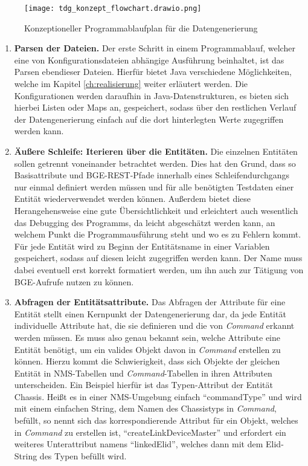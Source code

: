 \begin{figure}[htp]
    \centering
    \texttt{[image: tdg\_konzept\_flowchart.drawio.png]}
    \caption{Konzeptioneller Programmablaufplan für die Datengenerierung\footnotemark}
\end{figure}

\newpage
\begin{enumerate}
    \item \textbf{Parsen der Dateien.} Der erste Schritt in einem Programmablauf, welcher eine von Konfigurationsdateien abhängige Ausführung beinhaltet, ist das Parsen ebendieser Dateien. Hierfür bietet Java verschiedene Möglichkeiten, welche im Kapitel \ref{ch:realisierung} weiter erläutert werden. Die Konfigurationen werden daraufhin in Java-Datenstrukturen, es bieten sich hierbei Listen oder Maps an, gespeichert, sodass über den restlichen Verlauf der Datengenerierung einfach auf die dort hinterlegten Werte zugegriffen werden kann.
    \item \textbf{Äußere Schleife: Iterieren über die Entitäten.} Die einzelnen Entitäten sollen getrennt voneinander betrachtet werden. Dies hat den Grund, dass so Basisattribute und \ac{BGE}-\ac{REST}-Pfade innerhalb eines Schleifendurchgangs nur einmal definiert werden müssen und für alle benötigten Testdaten einer Entität wiederverwendet werden können. Außerdem bietet diese Herangehensweise eine gute Übersichtlichkeit und erleichtert auch wesentlich das Debugging des Programms, da leicht abgeschätzt werden kann, an welchem Punkt die Programmausführung steht und wo es zu Fehlern kommt. Für jede Entität wird zu Beginn der Entitätsname in einer Variablen gespeichert, sodass auf diesen leicht zugegriffen werden kann. Der Name muss dabei eventuell erst korrekt formatiert werden, um ihn auch zur Tätigung von \ac{BGE}-Aufrufe nutzen zu können.
    \item \textbf{Abfragen der Entitätsattribute.} Das Abfragen der Attribute für eine Entität stellt einen Kernpunkt der Datengenerierung dar, da jede Entität individuelle Attribute hat, die sie definieren und die von \textit{Command} erkannt werden müssen. Es muss also genau bekannt sein, welche Attribute eine Entität benötigt, um ein valides Objekt davon in \textit{Command} erstellen zu können. Hierzu kommt die Schwierigkeit, dass sich Objekte der gleichen Entität in \ac{NMS}-Tabellen und \textit{Command}-Tabellen in ihren Attributen unterscheiden. Ein Beispiel hierfür ist das Typen-Attribut der Entität Chassis. Heißt es in einer \ac{NMS}-Umgebung einfach \enquote{commandType} und wird mit einem einfachen String, dem Namen des Chassistyps in \textit{Command}, befüllt, so nennt sich das korrespondierende Attribut für ein Objekt, welches in \textit{Command} zu erstellen ist, \enquote{createLinkDeviceMaster} und erfordert ein weiteres Unterattribut namens \enquote{linkedElid}, welches dann mit dem \ac{Elid}-String des Typen befüllt wird.
    

\end{enumerate}
